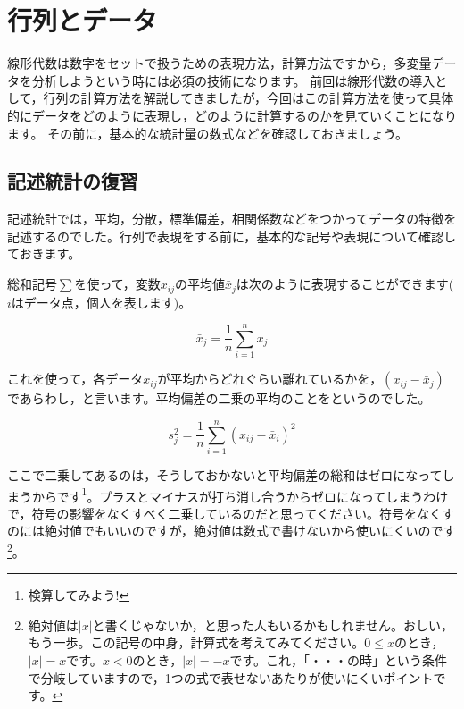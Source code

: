\documentclass{ltjsbook}
\begin{document}
\chapter{行列とデータ}
\label{L02_Data}

線形代数は数字をセットで扱うための表現方法，計算方法ですから，多変量データを分析しようという時には必須の技術になります。
前回は線形代数の導入として，行列の計算方法を解説してきましたが，今回はこの計算方法を使って具体的にデータをどのように表現し，どのように計算するのかを見ていくことになります。
その前に，基本的な統計量の数式などを確認しておきましょう。

\section{記述統計の復習}

記述統計では，平均，分散，標準偏差，相関係数などをつかってデータの特徴を記述するのでした。行列で表現をする前に，基本的な記号や表現について確認しておきます。

総和記号$\sum$を使って，変数$x_{ij}$の平均値$\bar{x}_j$は次のように表現することができます($i$はデータ点，個人を表します)。

\[ \bar{x}_j = \frac{1}{n}\sum_{i=1}^n x_j \]

これを使って，各データ$x_{ij}$が平均からどれぐらい離れているかを，$(x_{ij} - \bar{x}_j)$であらわし，と言います。平均偏差の二乗の平均のことをというのでした。

\[ s_j^2  = \frac{1}{n}\sum_{i=1}^n (x_{ij} - \bar{x}_i)^2 \]

ここで二乗してあるのは，そうしておかないと平均偏差の総和はゼロになってしまうからです\footnote{検算してみよう!}。プラスとマイナスが打ち消し合うからゼロになってしまうわけで，符号の影響をなくすべく二乗しているのだと思ってください。符号をなくすのには絶対値でもいいのですが，絶対値は数式で書けないから使いにくいのです\footnote{絶対値は$|x|$と書くじゃないか，と思った人もいるかもしれません。おしい，もう一歩。この記号の中身，計算式を考えてみてください。$0\le x$のとき，$|x|=x$です。$x<0$のとき，$|x|=-x$です。これ，「・・・の時」という条件で分岐していますので，1つの式で表せないあたりが使いにくいポイントです。}。
\end{document}
